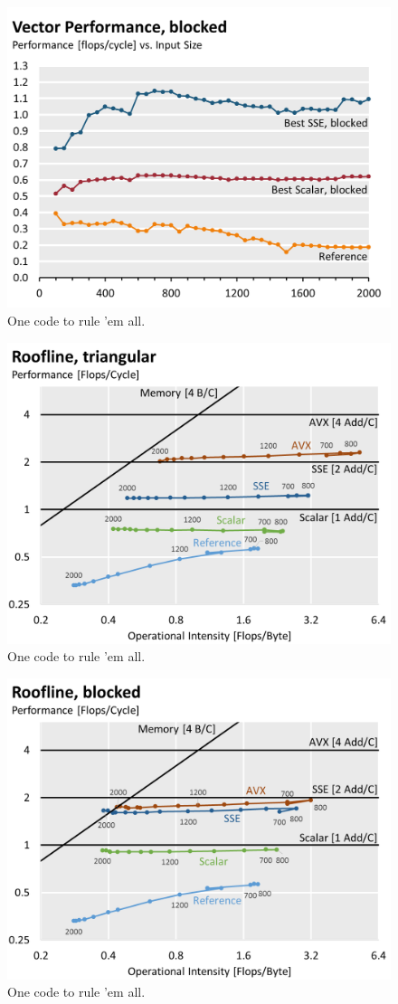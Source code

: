 \begin{figure}\centering
  \includegraphics[width=\linewidth]{plot_data/blocked_vector_performance.png}
  \caption{One code to rule 'em all.}
  \label{fig:perf-blocked}
\end{figure}
\begin{figure}\centering
  \includegraphics[width=\linewidth]{roofline-data/roofline_triangular.png}
  \caption{One code to rule 'em all.}
  \label{fig:roofline-triangular}
\end{figure}
\begin{figure}\centering
  \includegraphics[width=\linewidth]{roofline-data/roofline_blocked.png}
  \caption{One code to rule 'em all.}
  \label{fig:roofline-blocked}
\end{figure}